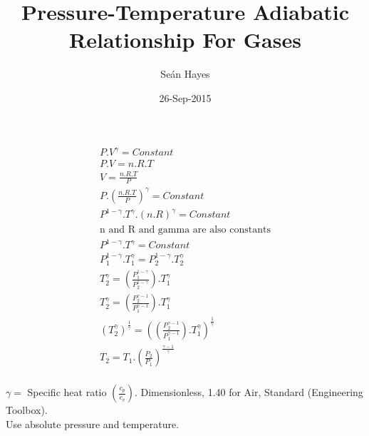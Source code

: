 \documentclass[a4paper]{article}
\title{Pressure-Temperature Adiabatic Relationship For Gases}
\author{Se\'an Hayes}
\date{26-Sep-2015}
\begin{document}
\maketitle
\begin{align*}
P . V^\gamma = Constant \\
P . V = n . R . T \\
V = \frac{n . R . T}{P} \\
P . \left(\frac{n . R . T}{P}\right)^\gamma = Constant \\
P^{1-\gamma} . T^\gamma . (n . R)^\gamma = Constant \\
\text{n and R and gamma are also constants} \\
P^{1-\gamma} . T^\gamma = Constant \\
P_1^{1-\gamma} . T_1^\gamma = P_2^{1-\gamma} . T_2^\gamma \\
T_2^\gamma = \left(\frac{P_1^{1-\gamma}}{P_2^{1-\gamma}}\right) . T_1^\gamma\\
T_2^\gamma = \left(\frac{P_2^{\gamma-1}}{P_1^{\gamma-1}}\right) . T_1^\gamma\\
\left(T_2^\gamma\right)^{\frac{1}{\gamma}} = \left(\left(\frac{P_2^{\gamma-1}}{P_1^{\gamma-1}}\right) . T_1^\gamma\right)^{\frac{1}{\gamma}}\\
T_2 = T_1 . \left(\frac{P_2}{P_1}\right)^{\frac{\gamma-1}{\gamma}} \\
\end{align*}

$\gamma = $ Specific heat ratio $\left(\frac{c_p}{c_v}\right)$. Dimensionless, 1.40 for Air, Standard (Engineering Toolbox).
\\

Use absolute pressure and temperature.
\end{document}
